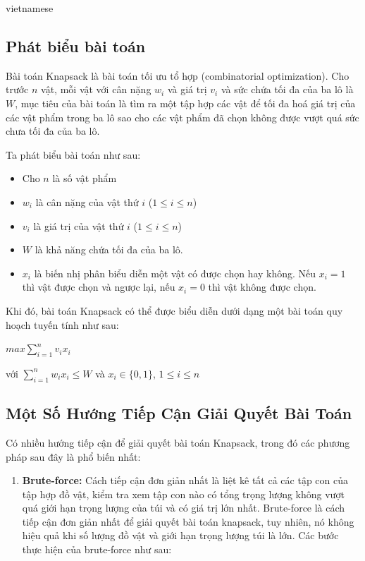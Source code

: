 \documentclass[a4paper]{article}
\begin{document}
\begin{otherlanguage*}{vietnamese}
\subsection{Phát biểu bài toán}

Bài toán Knapsack là bài toán tối ưu tổ hợp (combinatorial optimization). Cho trước $n$ vật, mỗi vật với cân nặng $w_{i}$ và giá trị $v_{i}$ và sức chứa tối đa của ba lô là $W$, mục tiêu của bài toán là tìm ra một tập hợp các vật để tối đa hoá giá trị của các vật phẩm trong ba lô sao cho các vật phẩm đã chọn không được vượt quá sức chưa tối đa của ba lô.

Ta phát biểu bài toán như sau:

\begin{itemize}
\item Cho $n$ là số vật phẩm
\item $w_{i}$ là cân nặng của vật thứ $i$ ($1 \leq i  \leq n$)
\item $v_{i}$ là giá trị của vật thứ $i$ ($1 \leq i  \leq n$)
\item $W$ là khả năng chứa tối đa của ba lô.
\item $x_{i}$ là biến nhị phân biểu diễn một vật có được chọn hay không. Nếu $x_{i} =1$ thì vật được chọn và ngược lại, nếu $x_{i} = 0$ thì vật không được chọn.
\end{itemize}

Khi đó, bài toán Knapsack có thể được biểu diễn dưới dạng một bài toán quy hoạch tuyến tính như sau:

\begin{center}
    
$max \sum_{i=1}^{n} v_{i}x_{i}$ 

với $\sum_{i=1}^{n} w_{i}x_{i} \leq W$ và $x_{i} \in \{0,1\}$, $1 \leq i \leq n$

\end{center}


\subsection{Một Số Hướng Tiếp Cận Giải Quyết Bài Toán}
Có nhiều hướng tiếp cận để giải quyết bài toán Knapsack, trong đó các phương pháp sau đây là phổ biến nhất:

\begin{enumerate}[leftmargin=7pt]
    \item \textbf{Brute-force:} Cách tiếp cận đơn giản nhất là liệt kê tất cả các tập con của tập hợp đồ vật, kiểm tra xem tập con nào có tổng trọng lượng không vượt quá giới hạn trọng lượng của túi và có giá trị lớn nhất.
    Brute-force là cách tiếp cận đơn giản nhất để giải quyết bài toán knapsack, tuy nhiên, nó không hiệu quả khi số lượng đồ vật và giới hạn trọng lượng túi là lớn. Các bước thực hiện của brute-force như sau:
    

\end{enumerate}
\end{otherlanguage*}
\end{document}
